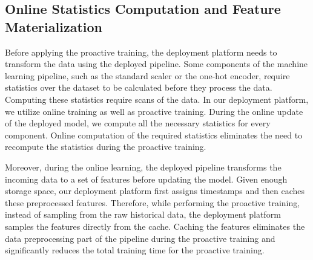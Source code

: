 
\subsection{Online Statistics Computation and Feature Materialization}
Before applying the proactive training, the deployment platform needs to transform the data using the deployed pipeline.
Some components of the machine learning pipeline, such as the standard scaler or the one-hot encoder, require statistics over the dataset to be calculated before they process the data.
Computing these statistics require scans of the data.
In our deployment platform, we utilize online training as well as proactive training.
During the online update of the deployed model, we compute all the necessary statistics for every component.
Online computation of the required statistics eliminates the need to recompute the statistics during the proactive training.

Moreover, during the online learning, the deployed pipeline transforms the incoming data to a set of features before updating the model.
Given enough storage space, our deployment platform first assigns timestamps and then caches these preprocessed features.
Therefore, while performing the proactive training, instead of sampling from the raw historical data, the deployment platform samples the features directly from the cache.
Caching the features eliminates the data preprocessing part of the pipeline during the proactive training and significantly reduces the total training time for the proactive training.


